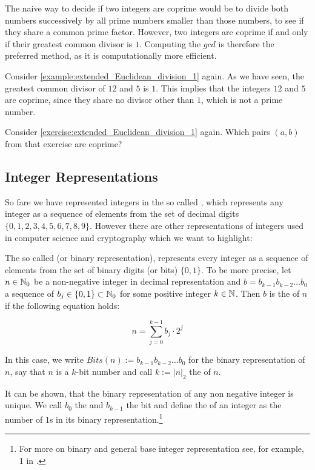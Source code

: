 The naive way to decide if two integers are coprime would be to divide both numbers successively by all prime numbers smaller than those numbers, to see if they share a common prime factor. However, two integers are coprime if and only if their greatest common divisor is $1$.  Computing the $gcd$ is therefore the preferred method, as it is computationally more efficient.

\begin{example} Consider \examplename{} \ref{example:extended_Euclidean_division_1} again. As we have seen, the greatest common divisor of $12$ and $5$ is $1$. This implies that the integers $12$ and $5$ are coprime, since they share no divisor other than $1$, which is not a prime number.
\end{example}
\begin{exercise} Consider \exercisename{} \ref{exercise:extended_Euclidean_division_1} again. Which pairs $(a,b)$ from that exercise are coprime?
\end{exercise}
\subsection{Integer Representations}
\label{sec:integer-rep}
So fare we have represented integers in the so called , which represents any integer as a sequence of elements from the set of decimal digits $\{0,1,2,3,4,5,6,7,8,9\}$. However there are other representations of integers used in computer science and cryptography which we want to highlight:

The so called  (or binary representation), represents every integer as a sequence of elements from the set of binary digits (or bits) $\{0,1\}$. To be more precise, let $n\in\mathbb{N}_0$ be a non-negative integer in decimal representation and $b=b_{k-1}b_{k-2}\ldots b_{0}$ a sequence of  $b_j\in\{0,1\}\subset\mathbb{N}_0$ for some positive integer $k\in\mathbb{N}$. Then $b$ is the  of $n$ if the following equation holds:

\begin{equation}
\label{def:binary_representation_integer}
n = \sum_{j=0}^{k-1} b_j\cdot 2^j
\end{equation}

In this case, we write $Bits(n):= b_{k-1}b_{k-2}\ldots b_{0}$ for the binary representation of $n$, say that $n$ is a $k$-bit number and call $k:= |n|_2$ the  of $n$. 

It can be shown, that the binary representation of any non negative integer is unique. We call $b_0$ the  and $b_{k-1}$ the  bit and define the  of an integer as the number of $1$s in its binary representation.\footnote{For more on binary and general base integer representation see, for example, \chaptname{} 1 in \cite{mignotte-1992}.}

